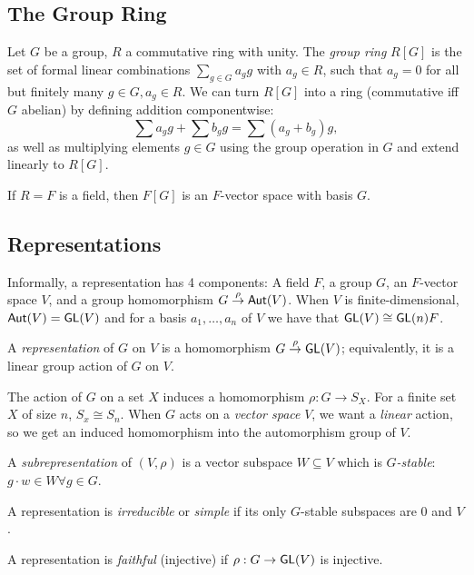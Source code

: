\subsection{The Group Ring}
\begin{definition}
Let $G$ be a group, $R$ a commutative ring with unity. The \emph{group ring} $R[G]$ is the set of formal linear combinations $\sum_{g\in G}a_g g$ with $a_g \in R$, such that $a_g = 0$ for all but finitely many $g\in G, a_g\in R$. We can turn $R[G]$ into a ring (commutative iff $G$ abelian) by defining addition componentwise:
\[
\sum a_g g + \sum b_g g = \sum (a_g + b_g)g, 
\]
as well as multiplying elements $g\in G$ using the group operation in $G$ and extend linearly to $R[G]$.
\end{definition}
\begin{example}
If $R = F$ is a field, then $F[G]$ is an $F$-vector space with basis $G$. 
\end{example}
\subsection{Representations}
Informally, a representation has 4 components: A field $F$, a group $G$, an $F$-vector space $V$, and a group homomorphism $G \overset{\rho}{\to} \mathsf{Aut}(V)$. When $V$ is finite-dimensional, $\mathsf{Aut}(V) = \mathsf{GL}(V)$ and for a basis $a_1, \ldots, a_n$ of $V$ we have that $\mathsf{GL}(V) \cong \mathsf{GL}(n)F$.
\begin{definition}
A \emph{representation} of $G$ on $V$ is a homomorphism $G \overset{\rho}{\to} \mathsf{GL}(V)$; equivalently, it is a linear group action of $G$ on $V$. 
\end{definition}
\begin{remark}
The action of $G$ on a set $X$ induces a homomorphism $\rho: G \to S_X$. For a finite set $X$ of size $n$, $S_x \cong S_n$. When $G$ acts on a \textit{vector space} $V$, we want a \textit{linear} action, so we get an induced homomorphism into the automorphism group of $V$.
\end{remark}
\begin{definition}
A \emph{subrepresentation} of $(V, \rho)$ is a vector subspace $W \subseteq V$ which is \emph{$G$-stable}: $g \cdot w \in W \forall g \in G$. 
\end{definition}
\begin{definition}
A representation is \emph{irreducible} or \emph{simple} if its only $G$-stable subspaces are $0$ and $V$. 
\end{definition}
\begin{definition}
A representation is \emph{faithful} (injective) if $\rho: G \to \mathsf{GL}(V)$ is injective.
\end{definition}

